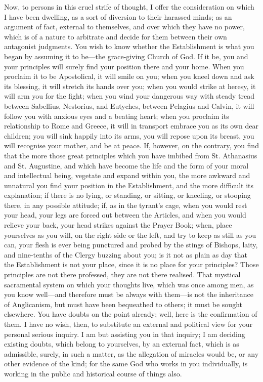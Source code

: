 Now, to persons in this cruel strife of thought, I offer the
consideration on which I have been dwelling, as a sort of diversion to
their harassed minds; as an argument of fact, external to themselves,
and over which they have no power, which is of a nature to arbitrate
and decide for them between their own antagonist judgments. You wish
to know whether the Establishment is what you began by assuming it to
be—the grace-giving Church of God. If it be, you and your principles
will surely find your position there and your home. When you proclaim
it to be Apostolical, it will smile on you; when you kneel down and
ask its blessing, it will stretch its hands over you; when you would
strike at heresy, it will arm you for the fight; when you wind your
dangerous way with steady tread between Sabellius, Nestorius, and
Eutyches, between Pelagius and Calvin, it will follow you with anxious
eyes and a beating heart; when you proclaim its relationship to Rome
and Greece, it will in transport embrace you as its own dear children;
you will sink happily into its arms, you will repose upon its breast,
you will recognise your mother, and be at peace. If, however, on the
contrary, you find that the more those great principles which you have
imbibed from St. Athanasius and St. Augustine, and which have become
the life and the form of your moral and intellectual being, vegetate
and expand within you, the more awkward and unnatural you find your
position in the Establishment, and the more difficult its explanation;
if there is no lying, or standing, or sitting, or kneeling, or
stooping there, in any possible attitude; if, as in the tyrant's cage,
when you would rest your head, your legs are forced out between the
Articles, and when you would relieve your back, your head strikes
against the Prayer Book; when, place yourselves as you will, on the
right side or the left, and try to keep as still as you can, your
flesh is ever being punctured and probed by the stings of Bishops,
laity, and nine-tenths of the Clergy buzzing about you; is it not as
plain as day that the Establishment is not your place, since it is no
place for your principles? Those principles are not there professed,
they are not there realised. That mystical sacramental system on which
your thoughts live, which was once among men, as you know well—and
therefore must be always with them—is not the inheritance of Anglicanism, but must have been bequeathed to others; it must be
sought elsewhere. You have doubts on the point already; well, here is
the confirmation of them. I have no wish, then, to substitute an
external and political view for your personal serious inquiry. I am
but assisting you in that inquiry; I am deciding existing doubts,
which belong to yourselves, by an external fact, which is as
admissible, surely, in such a matter, as the allegation of miracles
would be, or any other evidence of the kind; for the same God who
works in you individually, is working in the public and historical
course of things also.

